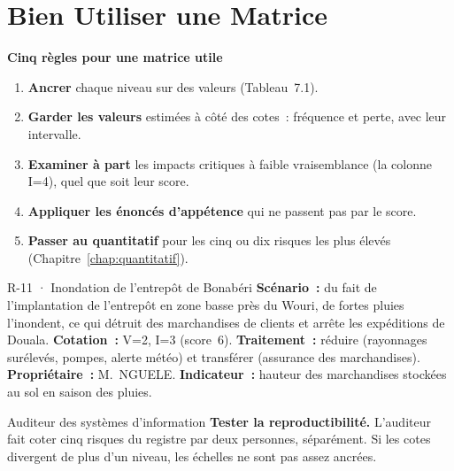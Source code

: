 \section{Bien Utiliser une Matrice}
\label{sec:c07-usage}

\begin{boxprocedure}
\textbf{Cinq règles pour une matrice utile}
\begin{enumerate}
    \item \textbf{Ancrer} chaque niveau sur des valeurs
          (Tableau~7.1).
    \item \textbf{Garder les valeurs} estimées à côté des cotes~: fréquence
          et perte, avec leur intervalle.
    \item \textbf{Examiner à part} les impacts critiques à faible
          vraisemblance (la colonne I=4), quel que soit leur score.
    \item \textbf{Appliquer les énoncés d'appétence} qui ne passent pas par
          le score.
    \item \textbf{Passer au quantitatif} pour les cinq ou dix risques les
          plus élevés (Chapitre~\ref{chap:quantitatif}).
\end{enumerate}
\end{boxprocedure}

\begin{boxobjet}{R-11 · Inondation de l'entrepôt de Bonabéri}
\textbf{Scénario~:} du fait de l'implantation de l'entrepôt en zone basse
près du Wouri, de fortes pluies l'inondent, ce qui détruit des
marchandises de clients et arrête les expéditions de Douala.
\textbf{Cotation~:} V=2, I=3 (score~6). \textbf{Traitement~:} réduire
(rayonnages surélevés, pompes, alerte météo) et transférer (assurance des
marchandises). \textbf{Propriétaire~:} M.~NGUELE. \textbf{Indicateur~:}
hauteur des marchandises stockées au sol en saison des pluies.
\end{boxobjet}

\begin{boxmetier}{Auditeur des systèmes d'information}
\textbf{Tester la reproductibilité.} L'auditeur fait coter cinq risques du
registre par deux personnes, séparément. Si les cotes divergent de plus
d'un niveau, les échelles ne sont pas assez ancrées.
\end{boxmetier}

\separateur

